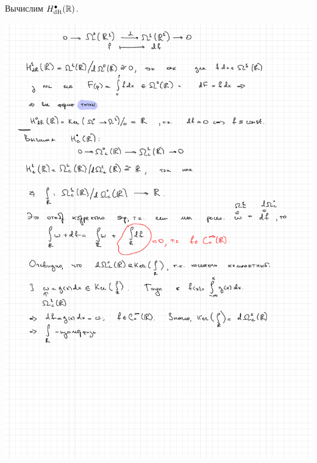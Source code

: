 	\begin{example}
		Вычислим $H^{\bullet}_{\operatorname{dR}}(\mathbb{R})$.

		\begin{center}
			\includegraphics[scale = 0.6]{lectures/7/pictures/line_de_Rham.pdf}
		\end{center}


\end{example}
